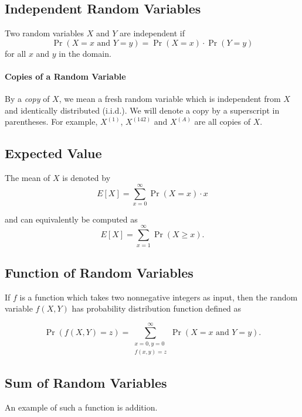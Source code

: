 \documentclass{masterthesis}
\begin{document}
\subsection*{Independent Random Variables}\label{paragraph:independent_random_variables}
Two random variables $X$ and $Y$ are independent if 
\begin{equation}
    \Pr(X = x \text{ and } Y = y) = \Pr(X = x) \cdot \Pr(Y = y)
\end{equation}
for all $x$ and $y$ in the domain.

\paragraph{Copies of a Random Variable}\label{paragraph:copies_of_a_random_variable} By a \textit{copy} of $X$, we mean a fresh random variable which is independent from $X$ and identically distributed (i.i.d.).
We will denote a copy by a superscript in parentheses. For example, $X^{(1)}$, $X^{(142)}$ and $X^{(A)}$ are all copies of $X$.

\subsection*{Expected Value}
The mean of $X$ is denoted by 
\begin{equation}\label{eq:expectation}
    E[X] = \sum_{x=0}^{\infty} \Pr(X = x) \cdot x
\end{equation}

and can equivalently be computed as 
\begin{equation}
    E[X] = \sum_{x=1}^{\infty} \Pr(X \geq x).
\end{equation}

\subsection*{Function of Random Variables}\label{paragraph:function_of_random_variables}
If $f$ is a function which takes two nonnegative integers as input, then the random variable $f(X, Y)$ has probability distribution function defined as

\begin{equation}
    \Pr(f(X, Y) = z) = \sum_{\substack{x=0, y=0 \\ f(x,y)=z}}^{\infty} \Pr(X = x \text{ and } Y = y).
\end{equation}

\subsection*{Sum of Random Variables}\label{paragraph:sum_of_random_variables}
An example of such a function is addition. 
\end{document}
